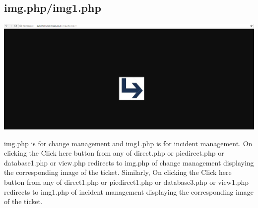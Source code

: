 \documentclass{article}
\begin{document}
\subsection{img.php/img1.php}
\begin{center}

    \includegraphics[width=7.0in]{img.png}
   
    \label{}

\end{center}
img.php is for change management and img1.php is for incident management. On clicking the Click here button from any of direct.php or piedirect.php or database1.php or view.php redirects to img.php of change management displaying the corresponding image of the ticket. Similarly, On clicking the Click here button from any of direct1.php or piedirect1.php or database3.php or view1.php redirects to img1.php of incident management displaying the corresponding image of the ticket.
\end{document}
